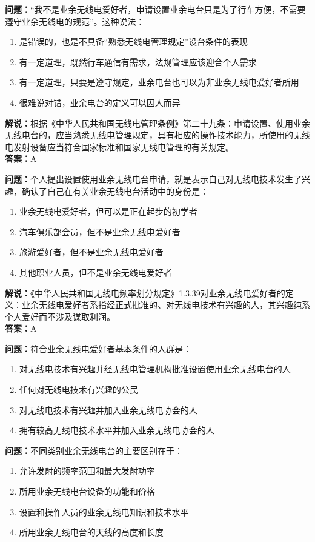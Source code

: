 \documentclass[UTF8]{ctexbook}
\begin{document}
\textbf{问题：}“我不是业余无线电爱好者，申请设置业余电台只是为了行车方便，不需要遵守业余无线电的规范”。这种说法：
\begin{enumerate}[label=\Alph*), leftmargin=3em]
  \item 是错误的，也是不具备“熟悉无线电管理规定”设台条件的表现
  \item 有一定道理，既然行车通信有需求，法规管理应该迎合个人需求
  \item 有一定道理，只要是遵守规定，业余电台也可以为非业余无线电爱好者所用
  \item 很难说对错，业余电台的定义可以因人而异
\end{enumerate}
\textbf{解说：}根据《中华人民共和国无线电管理条例》第二十九条：申请设置、使用业余无线电台的，应当熟悉无线电管理规定，具有相应的操作技术能力，所使用的无线电发射设备应当符合国家标准和国家无线电管理的有关规定。\\
\textbf{答案：}A

\textbf{问题：}个人提出设置使用业余无线电台申请，就是表示自己对无线电技术发生了兴趣，确认了自己在有关业余无线电台活动中的身份是：
\begin{enumerate}[label=\Alph*), leftmargin=3em]
  \item 业余无线电爱好者，但可以是正在起步的初学者
  \item 汽车俱乐部会员，但不是业余无线电爱好者
  \item 旅游爱好者，但不是业余无线电爱好者
  \item 其他职业人员，但不是业余无线电爱好者
\end{enumerate}
\textbf{解说：}《中华人民共和国无线电频率划分规定》1.3.39对业余无线电爱好者的定义：业余无线电爱好者系指经正式批准的、对无线电技术有兴趣的人，其兴趣纯系个人爱好而不涉及谋取利润。\\
\textbf{答案：}A

\textbf{问题：}符合业余无线电爱好者基本条件的人群是：
\begin{enumerate}[label=\Alph*), leftmargin=3em]
  \item 对无线电技术有兴趣并经无线电管理机构批准设置使用业余无线电台的人
  \item 任何对无线电技术有兴趣的公民
  \item 对无线电技术有兴趣并加入业余无线电协会的人
  \item 拥有较高无线电技术水平并加入业余无线电协会的人
\end{enumerate}

\textbf{问题：}不同类别业余无线电台的主要区别在于：
\begin{enumerate}[label=\Alph*), leftmargin=3em]
  \item 允许发射的频率范围和最大发射功率
  \item 所用业余无线电台设备的功能和价格
  \item 设置和操作人员的业余无线电知识和技术水平
  \item 所用业余无线电台的天线的高度和长度
\end{enumerate}
\end{document}
